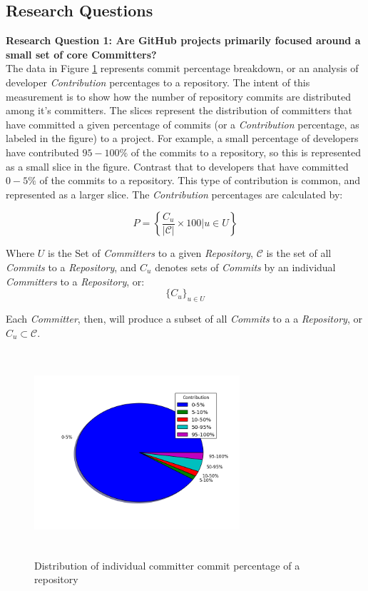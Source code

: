 \documentclass{proc}
\begin{document}
{{{{{\subsection{Research Questions}
\noindent \textbf{Research Question 1: Are GitHub projects primarily focused around a small set of core Committers?}\\
The data in Figure \ref{fig:committers_percentage_pie_chart} represents commit percentage breakdown, or an analysis of developer \textit{Contribution} percentages to a repository. The intent of this measurement is to show how the number of repository commits are distributed among it's committers. The slices represent the distribution of committers that have committed a given percentage of commits (or a \textit{Contribution} percentage, as labeled in the figure) to a project. For example, a small percentage of developers have contributed $95-100\%$ of the commits to a repository, so this is represented as a small slice in the figure. Contrast that to developers that have committed $0-5\%$ of the commits to a repository. This type of contribution is common, and represented as a larger slice. The \textit{Contribution} percentages are calculated by:

\begin{equation}
P = \left\{ \frac{ C_u } { |\mathscr{C}| } \times 100 \Big| u \in U \right\}
\label{eq:commit_percentage}
\end{equation}

Where $U$ is the Set of \textit{Committers} to a given \textit{Repository}, $\mathscr{C}$ is the set of all \textit{Commits} to a \textit{Repository}, and $C_u$ denotes sets of \textit{Commits} by an individual \textit{Committers} to a \textit{Repository}, or:
 \[ \{ C_u \}_{u \in U} \]

Each \textit{Committer}, then, will produce a subset of all \textit{Commits} to a a \textit{Repository}, or $C_u \subset \mathscr{C}$. 

\begin{figure}
\includegraphics[height=3in,width=3in]{images/committers_percentage_pie_chart.png}
\caption{Distribution of individual committer commit percentage of a repository}
\label{fig:committers_percentage_pie_chart}
\end{figure}

}}}}}
\end{document}
